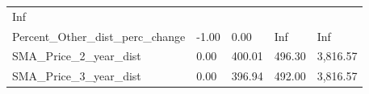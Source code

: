 \documentclass[]{article}
\begin{document}
\begin{longtable}[]{@{}lllll@{}}
\begin{minipage}[t]{0.11\columnwidth}
Inf\strut
\end{minipage}\tabularnewline
\begin{minipage}[t]{0.49\columnwidth}\raggedright\strut
Percent\_Other\_dist\_perc\_change\strut
\end{minipage} & \begin{minipage}[t]{0.08\columnwidth}\raggedright\strut
-1.00\strut
\end{minipage} & \begin{minipage}[t]{0.09\columnwidth}\raggedright\strut
0.00\strut
\end{minipage} & \begin{minipage}[t]{0.09\columnwidth}\raggedright\strut
Inf\strut
\end{minipage} & \begin{minipage}[t]{0.11\columnwidth}\raggedright\strut
Inf\strut
\end{minipage}\tabularnewline
\begin{minipage}[t]{0.49\columnwidth}\raggedright\strut
SMA\_Price\_2\_year\_dist\strut
\end{minipage} & \begin{minipage}[t]{0.08\columnwidth}\raggedright\strut
0.00\strut
\end{minipage} & \begin{minipage}[t]{0.09\columnwidth}\raggedright\strut
400.01\strut
\end{minipage} & \begin{minipage}[t]{0.09\columnwidth}\raggedright\strut
496.30\strut
\end{minipage} & \begin{minipage}[t]{0.11\columnwidth}\raggedright\strut
3,816.57\strut
\end{minipage}\tabularnewline
\begin{minipage}[t]{0.49\columnwidth}\raggedright\strut
SMA\_Price\_3\_year\_dist\strut
\end{minipage} & \begin{minipage}[t]{0.08\columnwidth}\raggedright\strut
0.00\strut
\end{minipage} & \begin{minipage}[t]{0.09\columnwidth}\raggedright\strut
396.94\strut
\end{minipage} & \begin{minipage}[t]{0.09\columnwidth}\raggedright\strut
492.00\strut
\end{minipage} & \begin{minipage}[t]{0.11\columnwidth}\raggedright\strut
3,816.57\strut
\end{minipage}\tabularnewline

\end{longtable}
\end{document}
